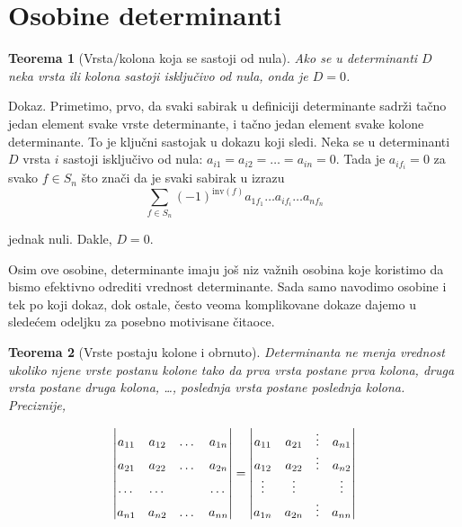 \documentclass[11pt]{article}
\theoremstyle{masulthm}
\newtheorem{theorem}{Teorema}[section]
\theoremstyle{masuldef}
\theoremstyle{masulexmp}
\newcommand{\inv}[1]{\text{inv}(#1)}
\begin{document}
\section{Osobine determinanti}

\begin{theorem}[Vrsta/kolona koja se sastoji od nula]

Ako se u determinanti $ D $ neka vrsta ili kolona sastoji isključivo od nula, onda je $ D = 0 $.

\end{theorem}

\noindent
Dokaz.
  Primetimo, prvo, da svaki sabirak u definiciji determinante sadrži tačno jedan element svake
  vrste determinante, i tačno jedan element svake kolone determinante.
  To je ključni sastojak u dokazu koji sledi.
  Neka se u determinanti $ D $ vrsta $ i $ sastoji isključivo od nula:
  $ a_{i1} = a_{i2} = \dots = a_{in} = 0 $.
  Tada je $ a_{if_i} = 0 $ za svako $ f \in S_n $ što znači da je svaki sabirak u izrazu%
\begin{equation*}
    \sum_{f \in S_n} (-1)^{\inv{f}} a_{1f_1} \dots a_{if_i} \dots a_{nf_n}
\end{equation*}

\noindent
jednak nuli. Dakle, $ D = 0 $.

Osim ove osobine, determinante imaju još niz važnih osobina koje koristimo da bismo
efektivno odrediti vrednost determinante. Sada samo navodimo osobine i tek po koji dokaz, dok ostale, često veoma komplikovane
dokaze dajemo u sledećem odeljku za posebno motivisane čitaoce.

\begin{theorem}[Vrste postaju kolone i obrnuto]

Determinanta ne menja vrednost ukoliko njene vrste postanu kolone tako da prva vrsta postane
prva kolona, druga vrsta postane druga kolona, \dots, poslednja vrsta postane poslednja kolona. Preciznije,

\newcommand{\D}{\vphantom{\vdots}}
\begin{align*}
    \begin{vmatrix}
        a_{11} & a_{12} & \dots & a_{1n} \D \\
        a_{21} & a_{22} & \dots & a_{2n} \D \\
        \dots  & \dots  &       & \dots  \D \\
        a_{n1} & a_{n2} & \dots & a_{nn} \D \\
    \end{vmatrix}
    =
    \begin{vmatrix}
        a_{11} & a_{21} & \vdots & a_{n1} \\
        a_{12} & a_{22} & \vdots & a_{n2} \\
        \vdots & \vdots &        & \vdots \\
        a_{1n} & a_{2n} & \vdots & a_{nn} \\
    \end{vmatrix}
\end{align*}

\end{theorem}
\end{document}

